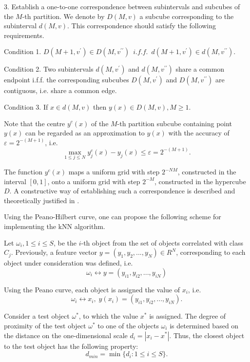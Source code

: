 \documentclass[sensors,article,submit,moreauthors,pdftex]{Definitions/mdpi}
\begin{document}
3. Establish a one-to-one correspondence between subintervals and subcubes of the $M$-th partition. We denote by $D(M,v)$ a subcube corresponding to the subinterval $d(M,v)$. This correspondence should satisfy the following requirements.

Condition 1. $D(M+1,v^\prime) \in D(M,v^{\prime\prime}) \;\: i.f.f. \;\:  d(M+1,v^\prime) \in d(M,v^{\prime\prime})$.

Condition 2. Two subintervals $d(M,v^\prime)$ and $d(M,v^{\prime\prime})$ share a common endpoint i.f.f. the corresponding subcubes $D(M,v^\prime)$ and $D(M,v^{\prime\prime})$  are  contiguous, i.e. share a common edge.

Condition 3.  If $x \in d(M,v)$ then $y(x) \in D(M,v), M \geq 1$.  

Note that the centre  $y^c(x)$ of the $M$-th partition subcube containing point $y(x)$ can be regarded as an approximation to $y(x)$ with the accuracy of $\varepsilon = 2^{-(M+1)}$, i.e.
\begin{equation}
\max_{1 \leq j \leq N} y_j^c(x)-y_j(x) \leq \varepsilon = 2^{-(M+1)}.
\end{equation} 

The function $y^c(x)$ maps a uniform grid with step $2^{-NM}$, constructed in the interval $[0,1]$, onto a uniform grid with step $2^{-M}$, constructed in the hypercube $D$. A constructive way of establishing such a correspondence is described and theoretically justified in \cite{Strongin2000, Sergeyev2013}.

Using the Peano-Hilbert curve, one can propose the following scheme for implementing the kNN algorithm.

Let $\omega_i, 1 \leq i \leq S$, be the $i$-th object from the set of objects correlated with class $C_j$. Previously, a feature vector $y = (y_1, y_2, ..., y_N) \in R^N$, corresponding to each object under consideration was defined, i.e. 
\begin{equation}
\omega_i \leftrightarrow y = (y_{i1}, y_{i2}, ..., y_{iN})
\end{equation} 

Using the Peano curve, each object is assigned the value of $x_i$, i.e.
\begin{equation}
\omega_i \leftrightarrow x_i, \; y(x_i) = (y_{i1}, y_{i2}, ..., y_{iN}).
\end{equation} 

Consider a test object $\omega^*$, to which the value $x^*$ is assigned. The degree of proximity of the test object $\omega^*$ to one of the objects $\omega_i$ is determined based on the distance on the one-dimensional scale $d_i = |x_i - x^* |$.
Thus, the closest object to the test object has the following property:
\begin{equation}
d_{min} = \min \{ d_i: 1 \leq i \leq S \}.
\end{equation} 
\end{document}
